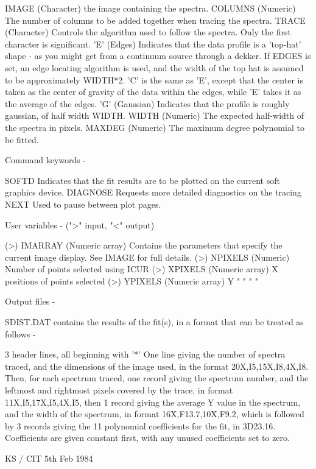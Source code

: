 \begin{description}
\begin{terminalv}
 IMAGE      (Character) the image containing the spectra.
 COLUMNS    (Numeric) The number of columns to be added
            together when tracing the spectra.
 TRACE      (Character) Controls the algorithm used to follow
            the spectra.  Only the first character is significant.
            'E' (Edges) Indicates that the data profile is a 'top-hat'
            shape - as you might get from a continuum source
            through a dekker.  If EDGES is set, an edge
            locating algorithm is used, and the width of the
            top hat is assumed to be approximately WIDTH*2.
            'C' is the same as 'E', except that the center is
            taken as the center of gravity of the data within the
            edges, while 'E' takes it as the average of the edges.
            'G' (Gaussian) Indicates that the profile is roughly
            gaussian, of half width WIDTH.
 WIDTH      (Numeric) The expected half-width of the spectra in
            pixels.
 MAXDEG     (Numeric) The maximum degree polynomial to be
            fitted.

 Command keywords -

 SOFTD      Indicates that the fit results are to be plotted on
            the current soft graphics device.
 DIAGNOSE   Requests more detailed diagnostics on the tracing
 NEXT       Used to pause between plot pages.

 User variables -  (">" input, "<" output)

 (>) IMARRAY  (Numeric array) Contains the parameters that
              specify the current image display.  See IMAGE
              for full details.
 (>) NPIXELS  (Numeric) Number of points selected using ICUR
 (>) XPIXELS  (Numeric array) X positions of points selected
 (>) YPIXELS  (Numeric array) Y      "    "     "      "

 Output files -

 SDIST.DAT contains the results of the fit(s), in a format that
           can be treated as follows -

           3 header lines, all beginning with '*'
           One line giving the number of spectra traced, and the
           dimensions of the image used, in the format
           20X,I5,15X,I8,4X,I8.
           Then, for each spectrum traced, one record giving
           the spectrum number, and the leftmost and rightmost
           pixels covered by the trace, in format
           11X,I5,17X,I5,4X,I5, then 1 record giving the average
           Y value in the spectrum, and the width of the
           spectrum, in format 16X,F13.7,10X,F9.2,
           which is followed by 3 records giving the 11
           polynomial coefficients for the fit, in 3D23.16.
           Coefficients are given constant first, with any unused
           coefficients set to zero.

                                         KS / CIT 5th Feb 1984
\end{terminalv}
\end{description}
